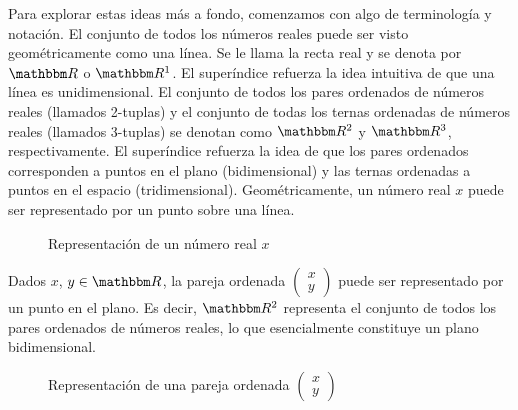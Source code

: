 Para explorar estas ideas más a fondo, comenzamos con algo de terminología y notación. El conjunto de todos los números reales puede ser visto geométricamente como una línea. Se le llama la recta real y se denota por $\RR$ o $\RR[1]$. El superíndice refuerza la idea intuitiva de que una línea es unidimensional. El conjunto de todos los pares ordenados de números reales (llamados 2-tuplas) y el conjunto de todas los ternas ordenadas de números reales (llamados 3-tuplas) se denotan como $\RR[2]$ y $\RR[3]$, respectivamente. El superíndice refuerza la idea de que los pares ordenados corresponden a puntos en el plano (bidimensional) y las ternas ordenadas a puntos en el espacio (tridimensional). Geométricamente, un número real $x$ puede ser representado por un punto sobre una línea.
\begin{figure}[h!]
    \centering
\caption{Representación de un número real $x$}
\end{figure}

Dados $x$, $y \in \RR$, la pareja ordenada $\begin{pmatrix} x \\ y \end{pmatrix}$ puede ser representado por un punto en el plano. Es decir, $\RR[2]$ representa el conjunto de todos los pares ordenados de números reales, lo que esencialmente constituye un plano bidimensional.
\begin{figure}[h!]
    \centering 
    \caption{Representación de una pareja ordenada $\begin{pmatrix} x \\ y \end{pmatrix}$}
\end{figure}


